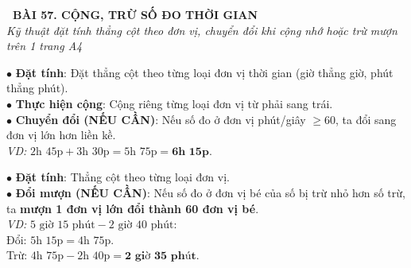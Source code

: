 \documentclass[14pt,a4paper,oneside]{extbook}
\begin{document}
\noindent
\begin{tcolorbox}[
  enhanced,
  colback=teal!8!white,
  colframe=teal!80!black,
  arc=3mm,
  boxrule=1.1pt,
  width=\linewidth,
  halign=center,
  top=2.2mm, bottom=2.2mm,
  left=3mm, right=3mm,
  drop fuzzy shadow
]
  {\large\bfseries\color{teal!95!black}\faBookmark\ BÀI 57. CỘNG, TRỪ SỐ ĐO THỜI GIAN}\\[2pt]
  {\scriptsize\color{black!75}\itshape Kỹ thuật đặt tính thẳng cột theo đơn vị, chuyển đổi khi cộng nhớ hoặc trừ mượn trên 1 trang A4}
\end{tcolorbox}

\vspace{3.2mm}
\noindent
\begin{minipage}[t]{0.50\textwidth}
  \begin{tcolorbox}[
    enhanced,
    title={\footnotesize\bfseries\color{white}\faPlus\ 1. Phép cộng số đo thời gian},
    colback=blue!2!white,
    colframe=blue!75!black,
    arc=2.5mm, boxrule=0.8pt, top=1.8mm, bottom=1.8mm, left=2.2mm, right=2.2mm
  ]
    \footnotesize
    $\bullet$ \textbf{Đặt tính}: Đặt thẳng cột theo từng loại đơn vị thời gian (giờ thẳng giờ, phút thẳng phút).\\
    $\bullet$ \textbf{Thực hiện cộng}: Cộng riêng từng loại đơn vị từ phải sang trái.\\
    $\bullet$ \textbf{Chuyển đổi (NẾU CẦN)}: Nếu số đo ở đơn vị phút/giây $\ge 60$, ta đổi sang đơn vị lớn hơn liền kề.\\
    \textit{VD:} $2\text{h } 45\text{p} + 3\text{h } 30\text{p} = 5\text{h } 75\text{p} = \mathbf{6\text{h } 15\text{p}}$.
  \end{tcolorbox}
\end{minipage}%
\hfill
\begin{minipage}[t]{0.48\textwidth}
  \begin{tcolorbox}[
    enhanced,
    title={\footnotesize\bfseries\color{white}\faMinus\ 2. Phép trừ số đo thời gian},
    colback=teal!2!white,
    colframe=teal!75!black,
    arc=2.5mm, boxrule=0.8pt, top=1.8mm, bottom=1.8mm, left=2mm, right=2mm
  ]
    \footnotesize
    $\bullet$ \textbf{Đặt tính}: Thẳng cột theo từng loại đơn vị.\\
    $\bullet$ \textbf{Đổi mượn (NẾU CẦN)}: Nếu số đo ở đơn vị bé của số bị trừ nhỏ hơn số trừ, ta \textbf{mượn 1 đơn vị lớn đổi thành 60 đơn vị bé}.\\
    \textit{VD:} $5\text{ giờ } 15\text{ phút} - 2\text{ giờ } 40\text{ phút}$:\\
    Đổi: $5\text{h } 15\text{p} = 4\text{h } 75\text{p}$.\\
    Trừ: $4\text{h } 75\text{p} - 2\text{h } 40\text{p} = \mathbf{2\text{ giờ } 35\text{ phút}}$.
  \end{tcolorbox}
\end{minipage}
\end{document}
